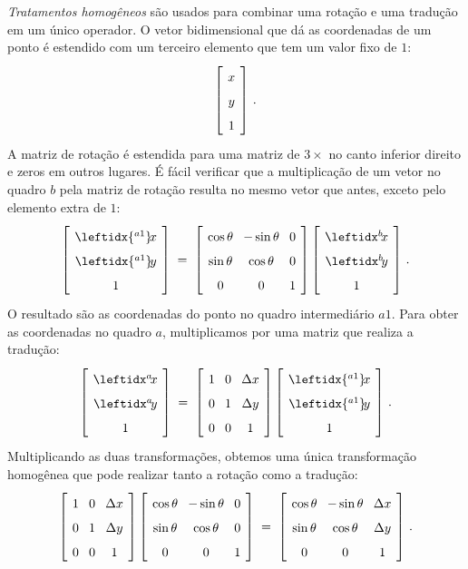 \emph{Tratamentos homogêneos} são usados para combinar uma rotação e uma tradução em um único operador. O vetor bidimensional que dá as coordenadas de um ponto é estendido com um terceiro elemento que tem um valor fixo de $1$:
\[
\spacearray
\left[\begin{array}{c}x\\y\\1\end{array}\right]\,.
\]
A matriz de rotação é estendida para uma matriz de $3\times$ no canto inferior direito e zeros em outros lugares. É fácil verificar que a multiplicação de um vetor no quadro $b$ pela matriz de rotação resulta no mesmo vetor que antes, exceto pelo elemento extra de $1$:
\[
\spacearray
\left[\begin{array}{c}\leftidx{^{a1}}\!{x}{}\\\leftidx{^{a1}}\!{y}{}\\1\end{array}\right]\;=\;
\left[\begin{array}{ccc}\cos\theta&-\sin\theta&0\\\sin\theta&\cos\theta&0\\0&0&1\end{array}\right]
\left[\begin{array}{c}\bx\\\by\\1\end{array}\right]\,.
\]
O resultado são as coordenadas do ponto no quadro intermediário $a1$. Para obter as coordenadas no quadro $a$, multiplicamos por uma matriz que realiza a tradução:
\[
\spacearray
\left[\begin{array}{c}\ax\\\ay\\1\end{array}\right]\;=\;
\left[\begin{array}{ccc}1&0&\Delta x\\0&1&\Delta y\\0&0&1\end{array}\right]
\left[\begin{array}{c}\leftidx{^{a1}}\!{x}{}\\\leftidx{^{a1}}\!{y}{}\\1\end{array}\right]\,.
\]
Multiplicando as duas transformações, obtemos uma única transformação homogênea que pode realizar tanto a rotação como a tradução:
\[
\spacearray
\left[\begin{array}{ccc}1&0&\Delta x\\0&1&\Delta y\\0&0&1\end{array}\right]
\left[\begin{array}{ccc}\cos\theta&-\sin\theta&0\\\sin\theta&\cos\theta&0\\0&0&1\end{array}\right]\;=\;
\left[\begin{array}{ccc}\cos\theta&-\sin\theta&\Delta x\\\sin\theta&\cos\theta&\Delta y\\0&0&1\end{array}\right]\,.
\]

